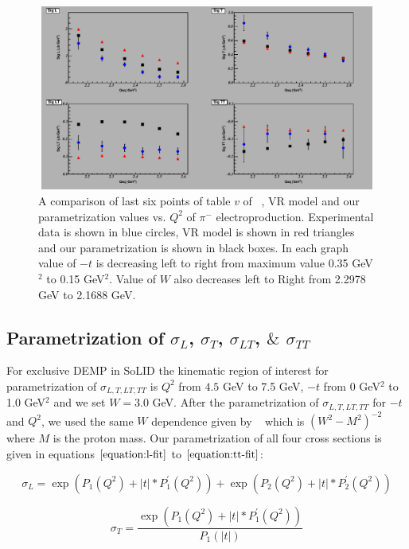 \begin{figure}[!hbt]
    \centering
    \includegraphics[width=6.0in,height=2.4in]{./figures/pimsigma_qsq.pdf}
    \caption{ A comparison of last six points of table $v$ of ~\cite{gmhuber-2}, VR model and our parametrization values vs. $Q^{2}$ 
    of $\pi^{-}$ electroproduction. Experimental data is shown in blue circles, VR model is shown in red triangles and our 
    parametrization is shown in black boxes. In each graph value of $-t$ is decreasing left to right from maximum value 0.35 GeV$^2$ 
    to 0.15 GeV$^2$. Value of $W$ also decreases left to Right from 2.2978 GeV to 2.1688 GeV.}
    \label{fig:expvrfit}
\end{figure}

\subsection{Parametrization of $\sigma_{L}$, $\sigma_{T}$, $\sigma_{LT}$, $\&$ $\sigma_{TT}$}
\label{parametrization}
For exclusive DEMP in SoLID the kinematic region of interest for parametrization of $\sigma_{L,T,LT,TT}$ is $Q^2$ 
from $4.5$ GeV to 7.5 GeV, $-t$ from 0 GeV$^2$ to 1.0 GeV$^2$ and we set $W=3.0$ GeV. After the parametrization of 
$\sigma_{L,T,LT,TT}$ for $-t$ and $Q^2$, we used the same $W$ dependence given by ~\cite{gmhuber} which is $(W^2-M^2)^{-2}$ where
$M$ is the proton mass. Our parametrization of all four cross sections is given in equations $\ref{equation:l-fit}$ to 
$\ref{equation:tt-fit}$:

\begin{equation}
        \sigma_{L} = \exp{(P_1(Q^2) + |t| * P^{\prime}_1(Q^2))} + \exp{(P_2(Q^2) + |t| * P^{\prime}_2(Q^2))}
     \label{equation:l-fit}
\end{equation}

\begin{equation}
        \sigma_{T} =  \frac{\exp{(P_1(Q^2) + |t| * P^{\prime}_1(Q^2))}}{P_{1}(|t|)}
     \label{equation:t-fit}
\end{equation}

